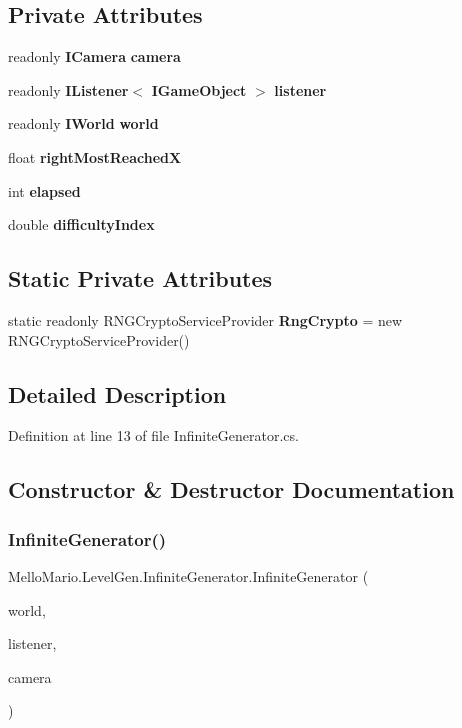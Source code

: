 \subsection*{Private Attributes}
\begin{DoxyCompactItemize}
\item 
readonly \textbf{ I\+Camera} \textbf{ camera}
\item 
readonly \textbf{ I\+Listener}$<$ \textbf{ I\+Game\+Object} $>$ \textbf{ listener}
\item 
readonly \textbf{ I\+World} \textbf{ world}
\item 
float \textbf{ right\+Most\+ReachedX}
\item 
int \textbf{ elapsed}
\item 
double \textbf{ difficulty\+Index}
\end{DoxyCompactItemize}
\subsection*{Static Private Attributes}
\begin{DoxyCompactItemize}
\item 
static readonly R\+N\+G\+Crypto\+Service\+Provider \textbf{ Rng\+Crypto} = new R\+N\+G\+Crypto\+Service\+Provider()
\end{DoxyCompactItemize}


\subsection{Detailed Description}


Definition at line 13 of file Infinite\+Generator.\+cs.



\subsection{Constructor \& Destructor Documentation}
\mbox{\label{classMelloMario_1_1LevelGen_1_1InfiniteGenerator_a529195a8b731b97e3eccc5b6f05116c9}} 
\subsubsection{Infinite\+Generator()}
{\footnotesize\ttfamily Mello\+Mario.\+Level\+Gen.\+Infinite\+Generator.\+Infinite\+Generator (\begin{DoxyParamCaption}\item[{\textbf{ I\+World}}]{world,  }\item[{\textbf{ I\+Listener}$<$ \textbf{ I\+Game\+Object} $>$}]{listener,  }\item[{\textbf{ I\+Camera}}]{camera }\end{DoxyParamCaption})}



